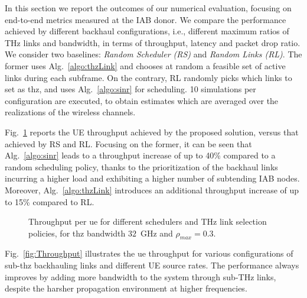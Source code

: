 In this section we report the outcomes of our numerical evaluation, focusing on end-to-end metrics measured at the IAB donor. We compare the performance achieved by different backhaul configurations, i.e., different maximum ratios of THz links and bandwidth, in terms of throughput, latency and packet drop ratio. We consider two baselines: \textit{Random Scheduler (RS)} and \textit{Random Links (RL)}. The former uses Alg.~\ref{algo:thzLink} and chooses at random a feasible set of active links during each subframe. On the contrary, RL randomly picks which links to set as \gls{thz}, and uses Alg.~\ref{algo:sinr} for scheduling. 10 simulations per configuration are executed, to obtain estimates which are averaged over the realizations of the wireless channels.

Fig.~\ref{fig:ThroughputPerDifferAlg} reports the UE throughput achieved by the proposed solution, versus that achieved by RS and RL. Focusing on the former, it can be seen that Alg.~\ref{algo:sinr} leads to a throughput increase of up to 40\% compared to a random scheduling policy, thanks to the prioritization of the backhaul links incurring a higher load and exhibiting a higher number of subtending IAB nodes. 
Moreover, Alg.~\ref{algo:thzLink} introduces an additional throughput increase of up to 15\% compared to RL.
\begin{figure}
    \centering
    \setlength{}
    \setlength{}
    
    \caption{Throughput per \gls{ue} for different schedulers and THz link selection policies, for \gls{thz} bandwidth $32$~GHz and $\rho_{max} = 0.3$.} 
    \label{fig:ThroughputPerDifferAlg}
\end{figure}

Fig.~\ref{fig:Throughput} illustrates the \gls{ue} throughput for various configurations of sub-\gls{thz} backhauling links and different UE source rates. 
The performance always improves by adding more bandwidth to the system through sub-THz links, despite the harsher propagation environment at higher frequencies.

